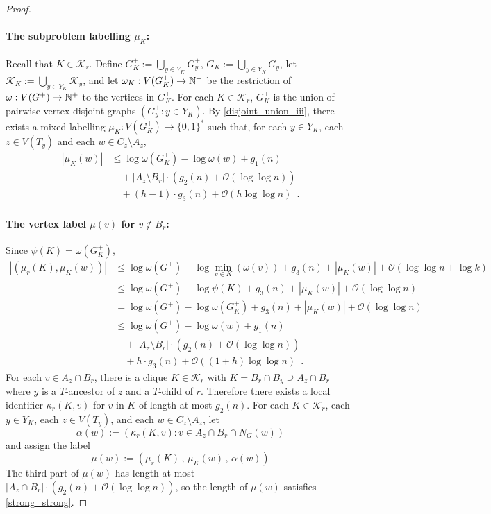 \documentclass{patmorin}
\renewcommand{\le}{\leqslant}
\newcommand{\Oh}{\mathcal{O}}
\let\eqref\cref
\begin{document}
\begin{proof}
    \paragraph{\boldmath The subproblem labelling $\mu_K$:}
    Recall that $K\in\mathcal{K}_r$. Define $G^+_K:=\bigcup_{y\in Y_K}G^+_y$, $G_K:=\bigcup_{y\in Y_K}G_y$, let $\mathcal{K}_K:=\bigcup_{y\in Y_K}\mathcal{K}_y$, and let $\omega_K:V(G^+_K)\to\mathbb{N}^+$ be the restriction of $\omega:V(G^+)\to\mathbb{N}^+$ to the vertices in $G^+_K$.
    For each $K\in\mathcal{K}_r$, $G^+_K$ is the union of pairwise vertex-disjoint graphs $(G^+_y:y\in Y_K)$.
    By \cref{disjoint_union_iii}, there exists a mixed labelling $\mu_K:V(G^+_K)\to\{0,1\}^*$ such that, for each $y\in Y_K$, each $z\in V(T_y)$ and each $w\in C_z\setminus A_z$,
    \begin{align*}
       |\mu_K(w)|
       & \le \log \omega(G^+_K) - \log\omega(w) + g_1(n) \\
        & \quad {} + |A_z\setminus B_r|\cdot (g_2(n) + \Oh(\log\log n)) \\
        & \quad {} + (h-1)\cdot g_3(n) + \Oh(h\log\log n) \enspace .
    \end{align*}

    \paragraph{\boldmath The vertex label $\mu(v)$ for $v\not\in B_r$:}
    Since $\psi(K)=\omega(G^+_K)$,
    \begin{align*}
       |(\mu_r(K),\mu_K(w))|
       & \le \log \omega(G^+) - \log\min_{v\in K}(\omega(v)) + g_3(n) + |\mu_K(w)| + \Oh(\log\log n + \log k) \\
       & \le \log \omega(G^+) - \log\psi(K) + g_3(n) + |\mu_K(w)| + \Oh(\log\log n) \\
       & = \log \omega(G^+) - \log\omega(G^+_K) + g_3(n) + |\mu_K(w)| + \Oh(\log\log n) \\
       & \le \log \omega(G^+) - \log\omega(w) + g_1(n) \\
       & \quad {} + |A_z\setminus B_r|\cdot (g_2(n) + \Oh(\log\log n)) \\
       & \quad {} + h\cdot g_3(n) + \Oh((1+h)\log\log n) \enspace .
    \end{align*}
    For each $v\in A_z\cap B_r$, there is a clique $K\in\mathcal{K}_r$ with $K=B_r\cap B_y\supseteq A_z\cap B_r$ where $y$ is a $T$-ancestor of $z$ and a $T$-child of $r$.
    Therefore there exists a local identifier $\kappa_r(K,v)$ for $v$ in $K$ of length at most $g_2(n)$.
    For each $K\in\mathcal{K}_r$, each $y\in Y_K$, each $z\in V(T_y)$, and each $w\in C_z\setminus A_z$, let
    \[
        \alpha(w):=(\kappa_r(K,v): v\in A_z\cap B_r\cap N_G(w))
    \]
     and assign the label
    \[
       \mu(w) := (\mu_r(K)\,,\, \mu_K(w)\,,\, \alpha(w) )
    \]
    The third part of $\mu(w)$ has length at most $|A_z\cap B_r|\cdot (g_2(n) + \Oh(\log\log n))$, so the length of $\mu(w)$ satisfies \eqref{strong_strong}.


\end{proof}
\end{document}
